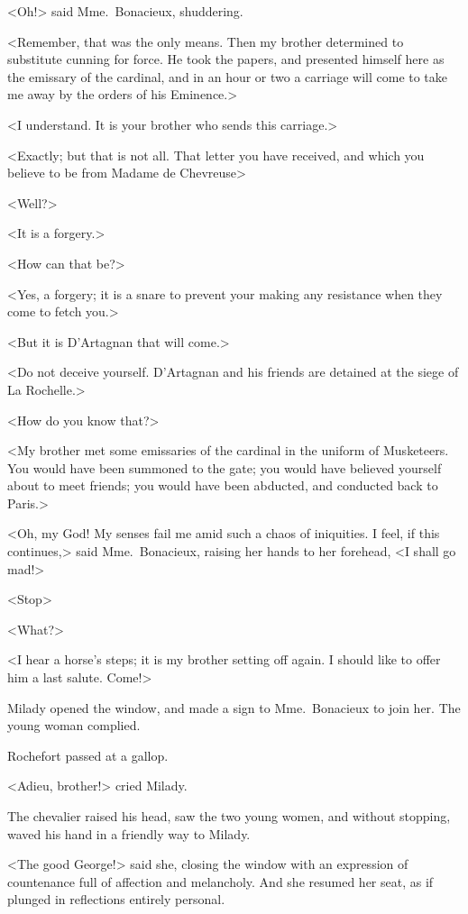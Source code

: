 <Oh!> said Mme.~Bonacieux, shuddering. 

<Remember, that was the only means. Then my brother determined to substitute cunning for force. He took the papers, and presented himself here as the emissary of the cardinal, and in an hour or two a carriage will come to take me away by the orders of his Eminence.> 

<I understand. It is your brother who sends this carriage.> 

<Exactly; but that is not all. That letter you have received, and which you believe to be from Madame de Chevreuse\longdash> 

<Well?> 

<It is a forgery.> 

<How can that be?> 

<Yes, a forgery; it is a snare to prevent your making any resistance when they come to fetch you.> 

<But it is D'Artagnan that will come.> 

<Do not deceive yourself. D'Artagnan and his friends are detained at the siege of La Rochelle.> 

<How do you know that?> 

<My brother met some emissaries of the cardinal in the uniform of Musketeers. You would have been summoned to the gate; you would have believed yourself about to meet friends; you would have been abducted, and conducted back to Paris.> 

<Oh, my God! My senses fail me amid such a chaos of iniquities. I feel, if this continues,> said Mme.~Bonacieux, raising her hands to her forehead, <I shall go mad!> 

<Stop\longdash> 

<What?> 

<I hear a horse's steps; it is my brother setting off again. I should like to offer him a last salute. Come!> 

Milady opened the window, and made a sign to Mme.~Bonacieux to join her. The young woman complied. 

Rochefort passed at a gallop. 

<Adieu, brother!> cried Milady. 

The chevalier raised his head, saw the two young women, and without stopping, waved his hand in a friendly way to Milady. 

<The good George!> said she, closing the window with an expression of countenance full of affection and melancholy. And she resumed her seat, as if plunged in reflections entirely personal. 

